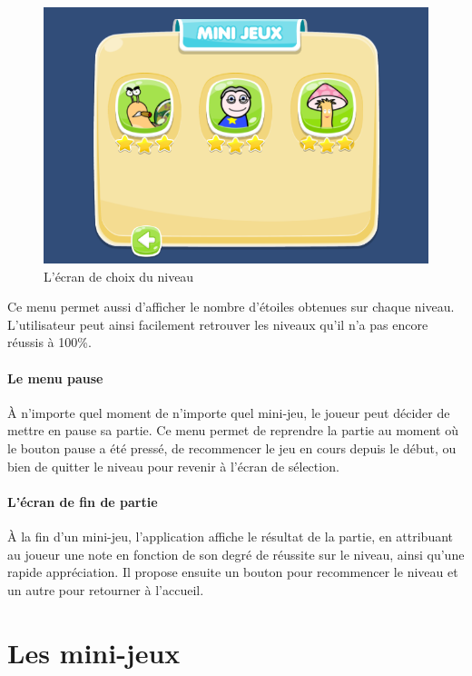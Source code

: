 \begin{figure}[H]\centering
  \includegraphics[scale=0.6]{./img/resultat_niveaux.png}
  \caption{L'écran de choix du niveau}
  \label{choix_niveau}
\end{figure}

Ce menu permet aussi d'afficher le nombre d'étoiles obtenues sur chaque niveau. L'utilisateur peut ainsi facilement retrouver les niveaux qu'il n'a pas encore réussis à 100\%.

\paragraph{Le menu pause}

À n'importe quel moment de n'importe quel mini-jeu, le joueur peut décider de mettre en pause sa partie. Ce menu permet de reprendre la partie au moment où le bouton pause a été pressé, de recommencer le jeu en cours depuis le début, ou bien de quitter le niveau pour revenir à l'écran de sélection.

\paragraph{L'écran de fin de partie}

À la fin d'un mini-jeu, l'application affiche le résultat de la partie, en attribuant au joueur une note en fonction de son degré de réussite sur le niveau, ainsi qu'une rapide appréciation. Il propose ensuite un bouton pour recommencer le niveau et un autre pour retourner à l'accueil.

\section*{Les mini-jeux}

